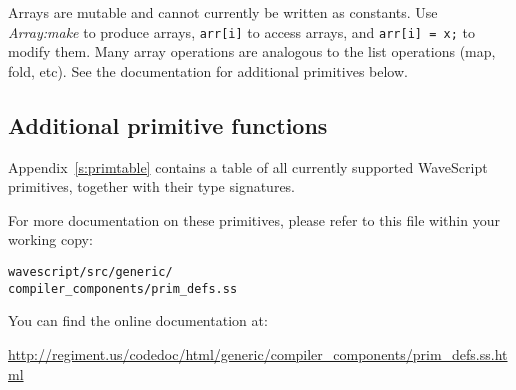 \documentclass[twocolumn]{report}
\newcommand{\ws}{WaveScript}
\begin{document}
Arrays are mutable and cannot currently be written as constants.  Use
{\em Array:make} to produce arrays, {\tt arr[i]} to access arrays, and
{\tt arr[i] = x;} to modify them.  Many array operations are analogous
to the list operations (map, fold, etc).  See the documentation for
additional primitives below.


\subsection{Additional primitive functions}

Appendix~\ref{s:primtable} contains a table of all currently supported
{\ws} primitives, together with their type signatures.

For more documentation on these primitives, please refer to this file
within your working copy:
\vspace{-2mm}
\begin{center}
{\tt{wavescript/src/generic/\\compiler\_components/prim\_defs.ss}}
\end{center}

You can find the online documentation at:
\vspace{-2mm}
\begin{center}
\url{http://regiment.us/codedoc/html/generic/compiler\_components/prim\_defs.ss.html}
\end{center}



\end{document}
